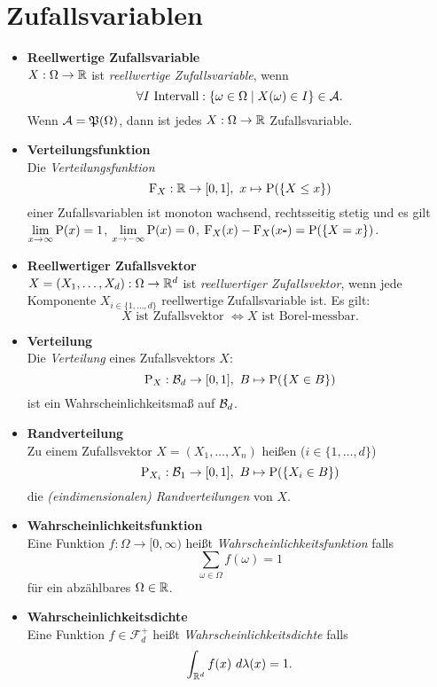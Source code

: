\section{Zufallsvariablen}
\begin{itemize}
\item \textbf{Reellwertige Zufallsvariable}\\
$X:\Omega\to\R$ ist \textit{reellwertige Zufallsvariable}, wenn
\[
	\forall I \text{ Intervall}: \{\omega\in\Omega\mid X(\omega)\in I\}\in\A.
\]
Wenn $\A=\mathfrak{P}(\Omega)$, dann ist jedes $X:\Omega\to\R$ Zufallsvariable.\\

\item \textbf{Verteilungsfunktion}\\
Die \textit{Verteilungsfunktion}
\[
	\F_X:\R\to[0,1],\ x\mapsto\P(\{X\leq x\})
\]
einer Zufallsvariablen ist monoton wachsend, rechtsseitig stetig und es gilt\\
$\lim\limits_{x\to\infty}\P(x)=1$,
$\lim\limits_{x\to -\infty}\P(x)=0$, 
\mbox{$\F_X(x)-\F_X(x\textbf{-})=\P(\{X=x\})$}.

\item \textbf{Reellwertiger Zufallsvektor}\\
$X=(X_1,\ldots,X_d):\Omega\to\R^d$ ist \textit{reellwertiger Zufallsvektor}, wenn jede
Komponente $X_{i\in\{1,\ldots,d\}}$ reellwertige Zufallsvariable ist. Es gilt:\\
\[
	X \text{ ist Zufallsvektor } \Leftrightarrow X \text{ ist Borel-messbar.}
\]

\item \textbf{Verteilung}\\
Die \textit{Verteilung} eines Zufallsvektors $X$: 
\[
	\P_X: \B{d}\to [0,1],\ B\mapsto\P(\{X\in B\})
\]
ist ein Wahrscheinlichkeitsmaß auf $\B{d}$.

\item \textbf{Randverteilung}\\
Zu einem Zufallsvektor $X=(X_1,\ldots,X_n)$ heißen ($i\in\{1,\ldots,d\}$)
\[
	\P_{X_i} :\B{1}\to[0,1],\ B\mapsto \P(\{X_i\in B\})
\]
die \textit{(eindimensionalen) Randverteilungen} von $X$.

\item \textbf{Wahrscheinlichkeitsfunktion}\\
Eine Funktion $f:\Omega\to[0,\infty)$ heißt \textit{Wahrscheinlichkeitsfunktion} falls
\[
	  \sum_{\omega\in\Omega} f(\omega)=1
\]
für ein abzählbares $\Omega\in\R$.

\item \textbf{Wahrscheinlichkeitsdichte}\\
Eine Funktion $f\in\mathcal{F}_d^+$ heißt \textit{Wahrscheinlichkeitsdichte} falls
\[
	 \int_{\R^d} f(x)~d\lambda(x)=1.
\]


\end{itemize}
